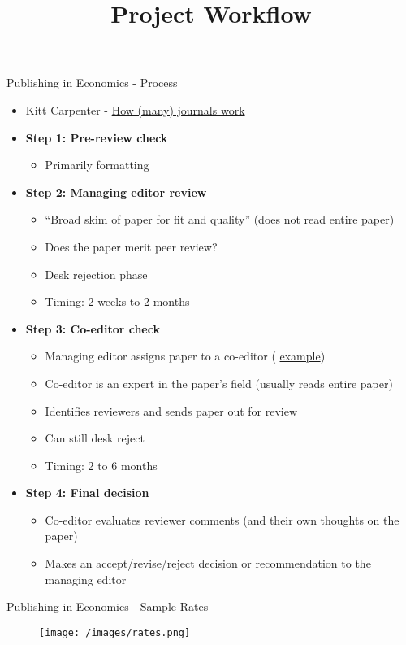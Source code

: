 \documentclass{beamer}
\title[]{Project Workflow}
\date{}
\begin{document}
\maketitle

\beamertemplatenavigationsymbolsempty
\begin{frame}{Publishing in Economics - Process}
    \begin{itemize}
        \item Kitt Carpenter - \color{blue} \href{https://www.appam.org/how-many-journals-work-a-far-from-incomplete-guide-for-public-policyeconomics-scholars/?pg=58&F_All=y}{How (many) journals work}
    \end{itemize}
    \smallskip
    \begin{itemize}
        \item \textbf{Step 1: Pre-review check} 
        \begin{itemize}
            \item Primarily formatting
        \end{itemize}
        \item \textbf{Step 2: Managing editor review}
        \begin{itemize}
            \item ``Broad skim of paper for fit and quality'' (does not read entire paper)
            \item Does the paper merit peer review?
            \item Desk rejection phase
            \item Timing: 2 weeks to 2 months
        \end{itemize}
        \item \textbf{Step 3: Co-editor check}
        \begin{itemize}
            \item Managing editor assigns paper to a co-editor (\color{blue} \href{https://www.aeaweb.org/journals/aer/about-aer/editors}{example}\color{black})
            \item Co-editor is an expert in the paper's field (usually reads entire paper)
            \item Identifies reviewers and sends paper out for review
            \item Can still desk reject
            \item Timing: 2 to 6 months
        \end{itemize}
        \item \textbf{Step 4: Final decision}
        \begin{itemize}
            \item Co-editor evaluates reviewer comments (and their own thoughts on the paper) 
            \item Makes an accept/revise/reject decision or recommendation to the managing editor
        \end{itemize}
    \end{itemize}          
\end{frame}

\begin{frame}{Publishing in Economics - Sample Rates}
    \begin{figure}
        \texttt{[image: /images/rates.png]}
    \end{figure}      
\end{frame}
\end{document}

